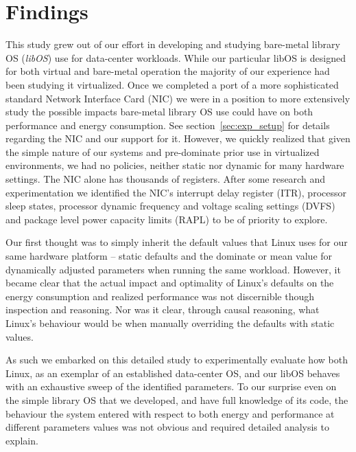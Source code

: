 \section{Findings}

This study grew out of our effort in developing and
studying bare-metal library OS ({\em libOS}) use for data-center workloads.
While our particular libOS is designed for both virtual and bare-metal
operation the majority of our experience had been studying it virtualized.  
Once we completed a port of a more sophisticated standard Network Interface
Card (NIC) we were in a position to more extensively study the possible impacts
bare-metal library OS use could have on both performance and energy consumption.  
See section~\cref{sec:exp_setup} for details regarding the NIC and our support
for it.  
However, we quickly realized that given the simple nature of our
systems and pre-dominate prior use in virtualized environments, we had no
policies, neither static nor dynamic for many hardware settings.  
The NIC alone has thousands of registers.  
After some research and experimentation we identified the NIC's interrupt delay
register (ITR), processor sleep states, processor dynamic frequency and voltage
scaling settings (DVFS) and package level power capacity limits (RAPL) to be of
priority to explore. 

Our first thought was to simply inherit the default values that Linux uses for
our same hardware platform -- static defaults and the dominate or
mean value for dynamically adjusted parameters when running the same workload. 
However, it became clear that the actual impact and optimality of Linux's
defaults on the energy consumption and realized performance was not discernible
though inspection and reasoning.  Nor was it clear, through causal
reasoning, what Linux's behaviour would be when manually overriding the
defaults with static values. 

As such we embarked on this detailed study to experimentally evaluate how both
Linux, as an exemplar of an established data-center OS, and our libOS
behaves with an exhaustive sweep of the identified parameters.  To our surprise
even on the simple library OS that we developed, and have full knowledge of its
code, the behaviour the system entered with respect to both energy and
performance at different parameters values was not obvious and required
detailed analysis to explain.  

